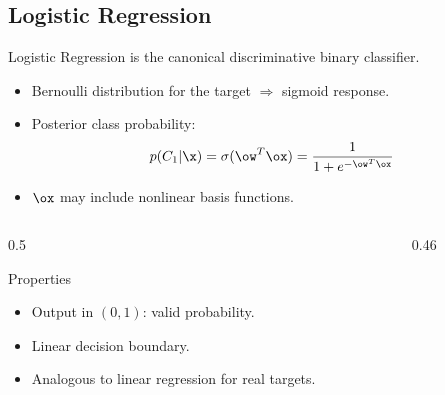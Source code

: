 \subsection{Logistic Regression}

\begin{frame}{Logistic Regression}
   is the canonical discriminative binary classifier.
  \begin{itemize}
    \item Bernoulli distribution for the target $\Rightarrow$ sigmoid response.
    \item Posterior class probability:
      \[
        p(C_1|\x) = \sigma(\ow^T\ox) = \frac{1}{1+e^{-\ow^T\ox}}
      \]
    \item $\ox$ may include nonlinear basis functions.
  \end{itemize}
  \vspace{0.3cm}
  \begin{columns}[T]
    \begin{column}{0.5\textwidth}
      \begin{block}{Properties}
        \begin{itemize}
          \item Output in $(0,1)$: valid probability.
          \item Linear decision boundary.
          \item Analogous to linear regression for real targets.
        \end{itemize}
      \end{block}
    \end{column}
    \begin{column}{0.46\textwidth}
    \end{column}
  \end{columns}
\end{frame}

